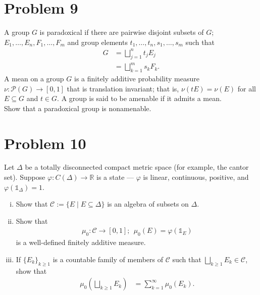 \documentclass[10pt]{extarticle}
\newcommand{\R}{\mathbb{R}}
\begin{document}
  \section{Problem 9}%
  A group $G$ is paradoxical if there are pairwise disjoint subsets of $G$; $E_1,\dots,E_n,F_1,\dots,F_m$ and group elements $t_1,\dots,t_n,s_1,\dots,s_m$ such that
  \begin{align*}
    G &= \bigsqcup_{j=1}^{n}t_jE_j\\
      &= \bigsqcup_{k=1}^{m}s_kF_k.
  \end{align*}
  A mean on a group $G$ is a finitely additive probability measure $\nu: \mathcal{P}(G)\rightarrow [0,1]$ that is translation invariant; that is, $\nu(tE) = \nu(E)$ for all $E\subseteq G$ and $t\in G$. A group is said to be amenable if it admits a mean.\\

  Show that a paradoxical group is nonamenable.
  \section{Problem 10}%
  Let $\Delta$ be a totally disconnected compact metric space (for example, the cantor set). Suppose $\varphi: C(\Delta)\rightarrow \R$ is a state --- $\varphi$ is linear, continuous, positive, and $\varphi\left(\mathbb{1}_{\Delta}\right) = 1$.
  \begin{enumerate}[(i)]
    \item Show that $\mathcal{C} := \{E\mid E\subseteq \Delta\}$ is an algebra of subsets on $\Delta$.
    \item Show that
      \begin{align*}
        \mu_0: \mathcal{C}\rightarrow [0,1];~~\mu_0(E) = \varphi\left(\mathbb{1}_{E}\right)
      \end{align*}
      is a well-defined finitely additive measure.
    \item If $\{E_k\}_{k\geq 1}$ is a countable family of members of $\mathcal{C}$ such that $\bigsqcup_{k\geq 1}E_k \in \mathcal{C}$, show that
      \begin{align*}
        \mu_0\left(\bigsqcup_{k\geq 1}E_k\right) &= \sum_{k=1}^{\infty}\mu_0(E_k).
      \end{align*}
  \end{enumerate}
\end{document}
